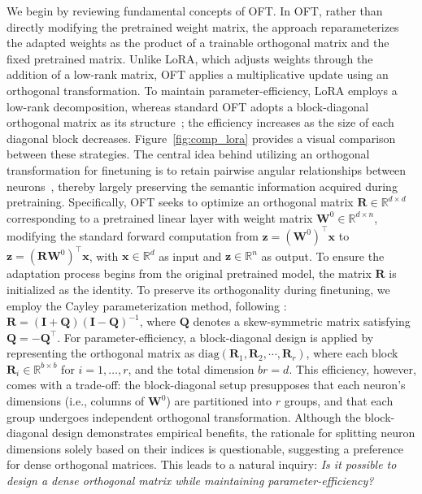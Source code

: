 We begin by reviewing fundamental concepts of OFT. In OFT, rather than directly modifying the pretrained weight matrix, the approach reparameterizes the adapted weights as the product of a trainable orthogonal matrix and the fixed pretrained matrix. Unlike LoRA, which adjusts weights through the addition of a low-rank matrix, OFT applies a multiplicative update using an orthogonal transformation. To maintain parameter-efficiency, LoRA employs a low-rank decomposition, whereas standard OFT adopts a block-diagonal orthogonal matrix as its structure~\cite{qiu2023controlling}; the efficiency increases as the size of each diagonal block decreases. Figure~\ref{fig:comp_lora} provides a visual comparison between these strategies. The central idea behind utilizing an orthogonal transformation for finetuning is to retain pairwise angular relationships between neurons~\cite{liu2018learning,liu2021orthogonal,qiu2023controlling}, thereby largely preserving the semantic information acquired during pretraining. Specifically, OFT seeks to optimize an orthogonal matrix $\bm{R}\in\mathbb{R}^{d\times d}$ corresponding to a pretrained linear layer with weight matrix $\bm{W}^0\in\mathbb{R}^{d\times n}$, modifying the standard forward computation from $\bm{z}=(\bm{W}^0)^\top\bm{x}$ to $\bm{z}=(\bm{R}\bm{W}^0)^\top\bm{x}$, with $\bm{x}\in\mathbb{R}^{d}$ as input and $\bm{z}\in\mathbb{R}^{n}$ as output. To ensure the adaptation process begins from the original pretrained model, the matrix $\bm{R}$ is initialized as the identity. To preserve its orthogonality during finetuning, we employ the Cayley parameterization method, following \cite{qiu2023controlling,liu2021orthogonal}: $\bm{R}=(\bm{I}+\bm{Q})(\bm{I}-\bm{Q})^{-1}$, where $\bm{Q}$ denotes a skew-symmetric matrix satisfying $\bm{Q}=-\bm{Q}^\top$. For parameter-efficiency, a block-diagonal design is applied by representing the orthogonal matrix as $\text{diag}(\bm{R}_1,\bm{R}_2,\cdots,\bm{R}_r)$, where each block $\bm{R}_i\in\mathbb{R}^{b\times b}$ for $i=1, \ldots, r$, and the total dimension $br=d$. This efficiency, however, comes with a trade-off: the block-diagonal setup presupposes that each neuron’s dimensions (i.e., columns of $\bm{W}^0$) are partitioned into $r$ groups, and that each group undergoes independent orthogonal transformation. Although the block-diagonal design demonstrates empirical benefits, the rationale for splitting neuron dimensions solely based on their indices is questionable, suggesting a preference for dense orthogonal matrices. This leads to a natural inquiry: \emph{Is it possible to design a dense orthogonal matrix while maintaining parameter-efficiency?}

